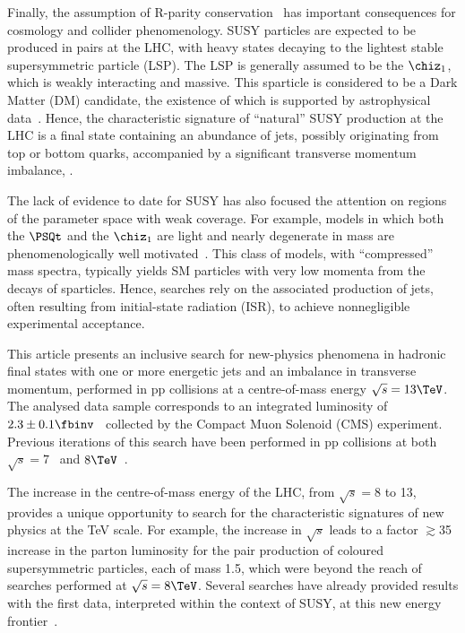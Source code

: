 Finally, the assumption of R-parity conservation~\cite{Farrar:1978xj}
has important consequences for cosmology and collider
phenomenology. SUSY particles are expected to be produced in pairs at
the LHC, with heavy states decaying to the lightest stable
supersymmetric particle (LSP). The LSP is generally assumed to be the
$\chiz_1$, which is weakly interacting and massive. This sparticle is
considered to be a Dark Matter (DM) candidate, the existence of which
is supported by astrophysical data~\cite{}. Hence, the characteristic
signature of ``natural'' SUSY production at the LHC is a final state
containing an abundance of jets, possibly originating from top or
bottom quarks, accompanied by a significant transverse momentum
imbalance, \ptvecmiss.

The lack of evidence to date for SUSY has also focused the attention
on regions of the parameter space with weak coverage. For example,
models in which both the $\PSQt$ and the $\chiz_1$ are light and
nearly degenerate in mass are phenomenologically well
motivated~\cite{}. This class of models, with ``compressed'' mass
spectra, typically yields SM particles with very low momenta from the
decays of sparticles. Hence, searches rely on the associated
production of jets, often resulting from initial-state radiation
(ISR), to achieve nonnegligible experimental acceptance.

This article presents an inclusive search for new-physics phenomena in
hadronic final states with one or more energetic jets and an imbalance
in transverse momentum, performed in pp collisions at a centre-of-mass
energy $\sqrt{s} = 13\TeV$. The analysed data sample corresponds to an
integrated luminosity of $2.3 \pm 0.1 \fbinv$~\cite{lumi} collected by
the Compact Muon Solenoid (CMS) experiment. Previous iterations of
this search have been performed in pp collisions at both $\sqrt{s} =
7$~\cite{RA1Paper, RA1Paper2011, RA1Paper2011FULL} and
$8\TeV$~\cite{RA1Paper2012, RA1Parked}. 

The increase in the centre-of-mass energy of the LHC, from $\sqrt{s} =
8$ to 13\TeV, provides a unique opportunity to search for the
characteristic signatures of new physics at the TeV scale. For
example, the increase in $\sqrt{s}$ leads to a factor $\gtrsim$35
increase in the parton luminosity for the pair production of coloured
supersymmetric particles, each of mass 1.5\TeV, which were beyond the
reach of searches performed at $\sqrt{s} = 8\TeV$. Several searches
have already provided results with the first data, interpreted within
the context of SUSY, at this new energy frontier~\cite{}.

